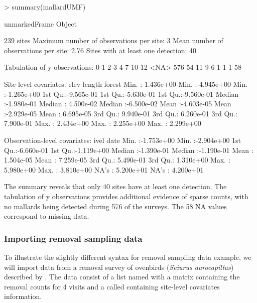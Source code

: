 \documentclass[article,shortnames]{jss}
\begin{document}
\begin{Schunk}
\begin{Sinput}
> summary(mallardUMF)
\end{Sinput}
\begin{Soutput}
unmarkedFrame Object

239 sites
Maximum number of observations per site: 3 
Mean number of observations per site: 2.76 
Sites with at least one detection: 40 

Tabulation of y observations:
   0    1    2    3    4    7   10   12 <NA> 
 576   54   11    9    6    1    1    1   58 

Site-level covariates:
      elev                length               forest          
 Min.   :-1.436e+00   Min.   :-4.945e+00   Min.   :-1.265e+00  
 1st Qu.:-9.565e-01   1st Qu.:-5.630e-01   1st Qu.:-9.560e-01  
 Median :-1.980e-01   Median : 4.500e-02   Median :-6.500e-02  
 Mean   :-4.603e-05   Mean   :-2.929e-05   Mean   : 6.695e-05  
 3rd Qu.: 9.940e-01   3rd Qu.: 6.260e-01   3rd Qu.: 7.900e-01  
 Max.   : 2.434e+00   Max.   : 2.255e+00   Max.   : 2.299e+00  

Observation-level covariates:
      ivel                 date           
 Min.   :-1.753e+00   Min.   :-2.904e+00  
 1st Qu.:-6.660e-01   1st Qu.:-1.119e+00  
 Median :-1.390e-01   Median :-1.190e-01  
 Mean   : 1.504e-05   Mean   : 7.259e-05  
 3rd Qu.: 5.490e-01   3rd Qu.: 1.310e+00  
 Max.   : 5.980e+00   Max.   : 3.810e+00  
 NA's   : 5.200e+01   NA's   : 4.200e+01  
\end{Soutput}
\end{Schunk}

The summary reveals that only 40 sites have at least one detection. The 
tabulation of y observations provides additional evidence of sparse counts, 
with no mallards being detected during 576 of the surveys. The 58 NA values 
correspond to missing data. 


\subsubsection{Importing removal sampling data}

To illustrate the slightly different syntax for removal sampling data example, 
we will import data from a removal survey of ovenbirds 
({\it Seiurus aurocapillus}) described by \citet{Royle2004a}.  The data consist 
of a list named  with 
a matrix  containing the removal counts for 4 visits and a 
 called  containing site-level covariates 
information.
\end{document}
